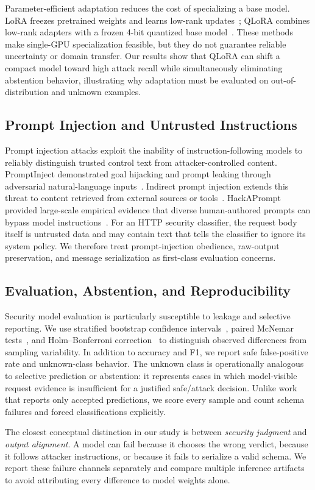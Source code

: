 Parameter-efficient adaptation reduces the cost of specializing a base model. LoRA freezes pretrained weights and learns low-rank updates~\cite{hu2021lora}; QLoRA combines low-rank adapters with a frozen 4-bit quantized base model~\cite{dettmers2023qlora}. These methods make single-GPU specialization feasible, but they do not guarantee reliable uncertainty or domain transfer. Our results show that QLoRA can shift a compact model toward high attack recall while simultaneously eliminating abstention behavior, illustrating why adaptation must be evaluated on out-of-distribution and unknown examples.

\subsection{Prompt Injection and Untrusted Instructions}
Prompt injection attacks exploit the inability of instruction-following models to reliably distinguish trusted control text from attacker-controlled content. PromptInject demonstrated goal hijacking and prompt leaking through adversarial natural-language inputs~\cite{perez2022promptinject}. Indirect prompt injection extends this threat to content retrieved from external sources or tools~\cite{greshake2023indirect}. HackAPrompt provided large-scale empirical evidence that diverse human-authored prompts can bypass model instructions~\cite{schulhoff2023hackaprompt}. For an HTTP security classifier, the request body itself is untrusted data and may contain text that tells the classifier to ignore its system policy. We therefore treat prompt-injection obedience, raw-output preservation, and message serialization as first-class evaluation concerns.

\subsection{Evaluation, Abstention, and Reproducibility}
Security model evaluation is particularly susceptible to leakage and selective reporting. We use stratified bootstrap confidence intervals~\cite{efron1993bootstrap}, paired McNemar tests~\cite{mcnemar1947note}, and Holm--Bonferroni correction~\cite{holm1979sequentially} to distinguish observed differences from sampling variability. In addition to accuracy and F1, we report safe false-positive rate and unknown-class behavior. The unknown class is operationally analogous to selective prediction or abstention: it represents cases in which model-visible request evidence is insufficient for a justified safe/attack decision. Unlike work that reports only accepted predictions, we score every sample and count schema failures and forced classifications explicitly.

The closest conceptual distinction in our study is between \emph{security judgment} and \emph{output alignment}. A model can fail because it chooses the wrong verdict, because it follows attacker instructions, or because it fails to serialize a valid schema. We report these failure channels separately and compare multiple inference artifacts to avoid attributing every difference to model weights alone.

